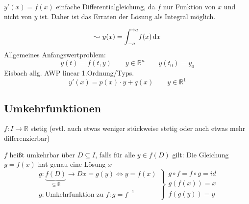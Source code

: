 
\noindent $y'(x) = f(x)$ einfache Differentialgleichung, da $f$ nur Funktion von $x$ und nicht von $y$ ist. 
Daher ist das Erraten der Lösung als Integral möglich.

\begin{equation*}\leadsto y(x) = \int_{-a}^{+a} \! f(x) \, \mathrm d x\end{equation*}
Allgemeines Anfangswertproblem:
\begin{equation*}\dot y(t) = f(t, y) \qquad y \in \mathbb{R}^n \qquad y(t_0) = y_0\end{equation*}
Eisbach allg. AWP linear 1.Ordnung/Typs.
\[ y'(x) = p(x)\cdot y + q(x)\qquad y \in \mathbb{R}^1 \]

\subsection{Umkehrfunktionen}
$f: I \to \mathbb{R}$ stetig (evtl. auch etwas weniger stückweise stetig oder auch etwas mehr differenzierbar)

\begin{definition}[Umkehrbarkeit]
    $f$ heißt umkehrbar über $D \subseteq I$, falls für alle $y \in f(D)$ gilt:
    Die Gleichung $y=f(x)$ hat genau eine Lösung $x$
    \begin{equation*}
        \left.
        \begin{array}{r}
            g:\underbrace{f(D)}_{\subseteq \mathbb{R}} \to D x= g(y) \Leftrightarrow y=f(x) \\
            g: \text{Umkehrfunktion zu }f: g=f^{-1}
        \end{array}
        \right\}
        \begin{array}{l}
            g \circ f = f \circ g = id\\
            g(f(x)) = x\\
            f(g(y)) = y
        \end{array}
    \end{equation*}
\end{definition}

